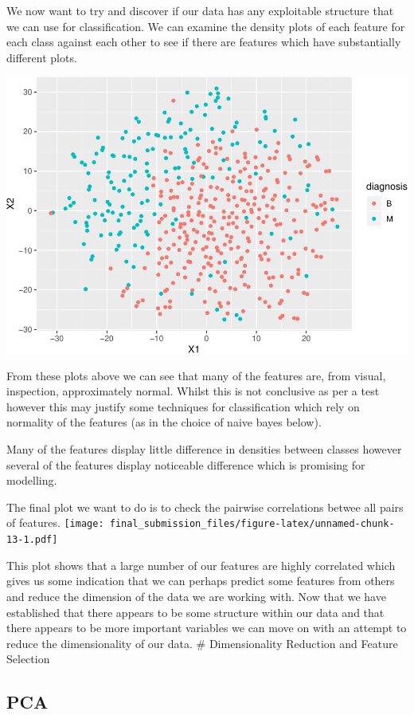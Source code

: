\documentclass[]{article}
\begin{document}
We now want to try and discover if our data has any exploitable
structure that we can use for classification. We can examine the density
plots of each feature for each class against each other to see if there
are features which have substantially different plots.

\includegraphics{final_submission_files/figure-latex/unnamed-chunk-12-1.pdf}

From these plots above we can see that many of the features are, from
visual, inspection, approximately normal. Whilst this is not conclusive
as per a test however this may justify some techniques for
classification which rely on normality of the features (as in the choice
of naive bayes below).

Many of the features display little difference in densities between
classes however several of the features display noticeable difference
which is promising for modelling.

The final plot we want to do is to check the pairwise correlations
betwee all pairs of features.
\texttt{[image: final\_submission\_files/figure-latex/unnamed-chunk-13-1.pdf]}

This plot shows that a large number of our features are highly
correlated which gives us some indication that we can perhaps predict
some features from others and reduce the dimension of the data we are
working with. Now that we have established that there appears to be some
structure within our data and that there appears to be more important
variables we can move on with an attempt to reduce the dimensionality of
our data. \newpage
\# Dimensionality Reduction and Feature Selection

\subsection{PCA}\label{pca}
\end{document}
